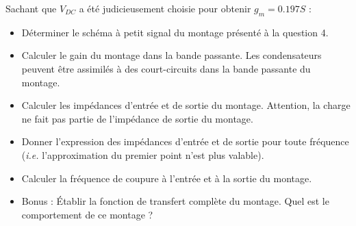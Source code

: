 \documentclass{../template/tp}
\begin{document}
\Question
{
Sachant que $V_{DC}$ a été judicieusement choisie pour obtenir $g_m=0.197S$ :
 
 \begin{itemize}
 \item Déterminer le schéma à petit signal du montage présenté à la question 4.
 \item Calculer le gain du montage dans la bande passante. Les condensateurs peuvent être assimilés à des court-circuits dans la bande passante du montage.
 \item Calculer les impédances d'entrée et de sortie du montage. Attention, la charge ne fait pas partie de l'impédance de sortie du montage.
 \item Donner l'expression des impédances d'entrée et de sortie pour toute fréquence (\textit{i.e.} l'approximation du premier point n'est plus valable).
 \item Calculer la fréquence de coupure à l'entrée et à la sortie du montage.
 \item Bonus : Établir la fonction de transfert complète du montage. Quel est le comportement de ce montage ?
 \end{itemize}

}
\end{document}
